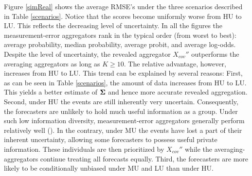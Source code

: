 \documentclass[11pt]{article}
\theoremstyle{definition}
\theoremstyle{definition}
\def\bSigma{{\bf \Sigma}}
\begin{document}
Figure \ref{simReal} shows the average RMSE's under the three scenarios described in Table \ref{scenarios}. Notice that the scores become uniformly worse from HU to LU. This reflects the decreasing level of uncertainty. 
In all the figures the measurement-error aggregators rank in the typical order (from worst to best): average probability, median probability, average probit, and average log-odds. Despite the level of uncertainty, the revealed aggregator $X_{cov}''$ outperforms the averaging aggregators as long as $K \geq 10$. 
The relative advantage, however, increases from HU to LU. This trend can be explained by several reasons: First, as can be seen in Table \ref{scenarios}, the amount of data increases from HU to LU. This yields a better estimate of $\bSigma$ and hence more accurate revealed aggregation. Second, under HU the events are still inherently very uncertain. Consequently, the forecasters are unlikely to hold much useful information as a group. Under such low information diversity, measurement-error aggregators generally perform relatively well (\citealt{satopaamodeling}).  In the contrary, under MU  the events have lost a part of their inherent uncertainty, allowing some forecasters to possess useful private information. These individuals are then prioritized by $X_{cov}''$ while the averaging-aggregators continue treating all forecasts equally. Third, the forecasters are more likely to be conditionally unbiased under MU and LU than under HU. 



\end{document}
